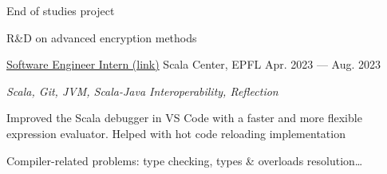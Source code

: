 \begin{MainPart}
{    End of studies project

    \vspace{0.5\baselineskip}
    R\&D on advanced encryption methods
  }
  \Experience%
  {\href{https://github.com/scalacenter/scala-debug-adapter/pulls?q=is\%3Apr+author\%3Aiusildra+}{Software Engineer Intern (link)}}
  {Scala Center, EPFL}
  {Apr. 2023 --- Aug. 2023}
  {
    \textit{Scala, Git, JVM, Scala-Java Interoperability, Reflection}
    \begin{ItemList}{\ColorHighlight}
      \item[\ding{226}] Improved the Scala debugger in VS Code with a faster and more flexible expression evaluator. Helped with hot code reloading implementation
      \item[\ding{226}] Compiler-related problems: type checking, types \& overloads resolution\dots
    \end{ItemList}
  }

\end{MainPart}